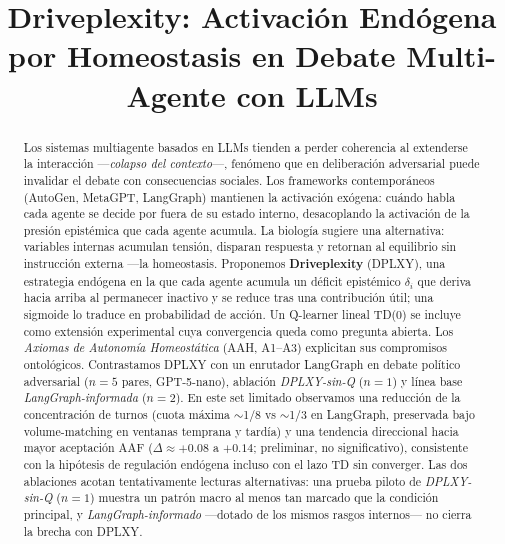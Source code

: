 \documentclass{llncs}
\begin{document}
\clearpage

\title{Driveplexity: Activaci\'on End\'ogena por Homeostasis en
Debate Multi-Agente con LLMs}
\maketitle

\begin{abstract}
Los sistemas multiagente basados en LLMs tienden a perder coherencia
al extenderse la interacci\'on ---\emph{colapso del contexto}---,
fen\'omeno que en deliberaci\'on adversarial puede invalidar el
debate con consecuencias sociales. Los frameworks contempor\'aneos
(AutoGen, MetaGPT, LangGraph) mantienen la activaci\'on ex\'ogena:
cu\'ando habla cada agente se decide por fuera de su estado
interno, desacoplando la activaci\'on de la presi\'on epist\'emica
que cada agente acumula. La biolog\'ia sugiere una alternativa:
variables internas acumulan
tensi\'on, disparan respuesta y retornan al equilibrio sin
instrucci\'on externa ---la homeostasis. Proponemos
\textbf{Driveplexity} (DPLXY), una estrategia end\'ogena en la
que cada agente acumula un d\'eficit epist\'emico $\delta_i$ que
deriva hacia arriba al permanecer inactivo y se reduce tras una
contribuci\'on \'util; una sigmoide lo traduce en probabilidad de
acci\'on. Un Q-learner lineal TD(0) se incluye como extensi\'on
experimental cuya convergencia queda como pregunta abierta. Los
\emph{Axiomas de Autonom\'ia Homeost\'atica} (AAH, A1--A3)
explicitan sus compromisos ontol\'ogicos. Contrastamos DPLXY con
un enrutador LangGraph en debate pol\'itico adversarial ($n{=}5$
pares, GPT-5-nano), ablaci\'on \emph{DPLXY-sin-Q} ($n{=}1$) y
l\'inea base \emph{LangGraph-informada} ($n{=}2$). En este set
limitado observamos una reducci\'on de la concentraci\'on de turnos
(cuota m\'axima $\sim$1/8 vs $\sim$1/3 en LangGraph, preservada
bajo volume-matching en ventanas temprana y tard\'ia) y una
tendencia direccional hacia mayor aceptaci\'on AAF
($\Delta\approx{+}0.08$ a ${+}0.14$; preliminar, no significativo),
consistente con la hip\'otesis de regulaci\'on end\'ogena incluso
con el lazo TD sin converger. Las dos ablaciones acotan
tentativamente lecturas alternativas: una prueba piloto de
\emph{DPLXY-sin-Q} ($n{=}1$) muestra un patr\'on macro al menos
tan marcado que la condici\'on principal, y
\emph{LangGraph-informado} ---dotado de los mismos rasgos
internos--- no cierra la brecha con DPLXY.

\end{abstract}
\end{document}
